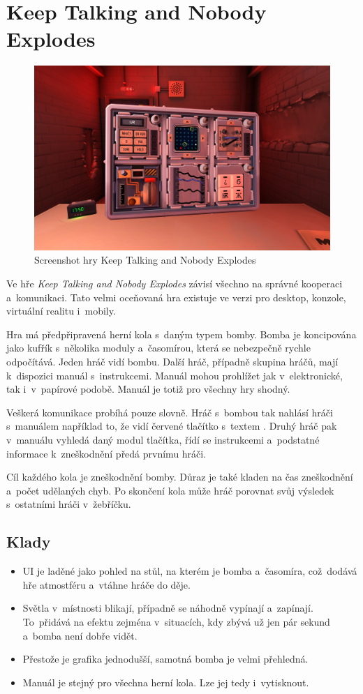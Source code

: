 \section{Keep Talking and Nobody Explodes}

\begin{figure}
    \centering
    \includegraphics[width=0.5\linewidth]{assets/competitive-apps/keep-talking.jpg}
    \caption{Screenshot hry Keep Talking and Nobody Explodes~\cite{steelcrategamesinc_keep_talking}}
    \label{fig:keep-talking}
\end{figure}

Ve hře \emph{Keep Talking and Nobody Explodes} závisí všechno na správné
kooperaci a~komunikaci.
Tato velmi oceňovaná hra existuje ve verzi pro desktop, konzole,
virtuální realitu i~mobily.~\cite{steelcrategamesinc_keep_talking}

Hra má předpřipravená herní kola s~daným typem bomby.
Bomba je koncipována jako kufřík s~několika moduly a~časomírou,
která se nebezpečně rychle odpočítává.
Jeden hráč vidí bombu.
Další hráč, případně skupina hráčů, mají k~dispozici manuál s~instrukcemi.
Manuál mohou prohlížet jak v~elektronické, tak i~v~papírové podobě.
Manuál je totiž pro všechny hry shodný.

Veškerá komunikace probíhá pouze slovně.
Hráč s~bombou tak nahlásí hráči s~manuálem například to,
že vidí červené tlačítko s~textem .
Druhý hráč pak v~manuálu vyhledá daný modul tlačítka, řídí se instrukcemi
a~podstatné informace k~zneškodnění předá prvnímu hráči.

Cíl každého kola je zneškodnění bomby.
Důraz je také kladen na čas zneškodnění a~počet udělaných chyb.
Po skončení kola může hráč porovnat svůj výsledek s~ostatními hráči v~žebříčku.

\subsection*{Klady}

\begin{itemize}
    \item UI je laděné jako pohled na stůl, na kterém je bomba a~časomíra,
    což~dodává hře atmostféru a~vtáhne hráče do děje.
    \item Světla v~místnosti blikají, případně se náhodně vypínají a~zapínají.
    To~přidává na efektu zejména v~situacích,
    kdy zbývá už jen pár sekund a~bomba není dobře vidět.
    \item Přestože je grafika jednodušší, samotná bomba je velmi přehledná.
    \item Manuál je stejný pro všechna herní kola. Lze jej tedy i~vytisknout.
\end{itemize}

